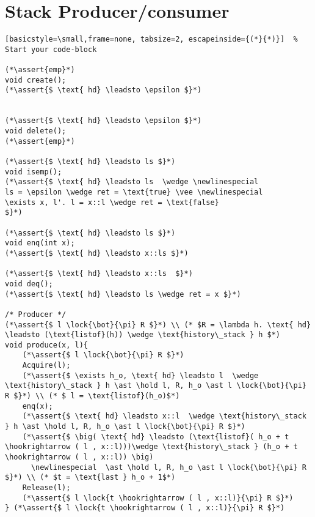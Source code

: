 \documentclass[8pt]{article}
\newcommand{\lock}[2]{ \square \hspace{-1ex} \xrightarrow[#1]{#2}}
\newcommand{\hold}{\text{Hold }}
\newcommand{\assert}[1]{\textcolor{blue}{ \{ #1 \}  } }
\newcommand{\newlinespecial}{\newline \hphantom{100pt}}
\begin{document}




\newpage
\section{Stack Producer/consumer}
\begin{lstlisting}[basicstyle=\small,frame=none, tabsize=2, escapeinside={(*}{*)}]  % Start your code-block

(*\assert{emp}*)
void create();
(*\assert{$ \text{ hd} \leadsto \epsilon $}*)


(*\assert{$ \text{ hd} \leadsto \epsilon $}*)
void delete();
(*\assert{emp}*)

(*\assert{$ \text{ hd} \leadsto ls $}*)
void isemp();
(*\assert{$ \text{ hd} \leadsto ls  \wedge \newlinespecial
ls = \epsilon \wedge ret = \text{true} \vee \newlinespecial
\exists x, l'. l = x::l \wedge ret = \text{false}
$}*)

(*\assert{$ \text{ hd} \leadsto ls $}*)
void enq(int x);
(*\assert{$ \text{ hd} \leadsto x::ls $}*)

(*\assert{$ \text{ hd} \leadsto x::ls  $}*)
void deq();
(*\assert{$ \text{ hd} \leadsto ls \wedge ret = x $}*)

/* Producer */
(*\assert{$ l \lock{\bot}{\pi} R $}*) \\ (* $R = \lambda h. \text{ hd} \leadsto (\text{listof}(h)) \wedge \text{history\_stack } h $*)
void produce(x, l){
	(*\assert{$ l \lock{\bot}{\pi} R $}*)
	Acquire(l);
	(*\assert{$ \exists h_o, \text{ hd} \leadsto l  \wedge \text{history\_stack } h \ast \hold l, R, h_o \ast l \lock{\bot}{\pi} R $}*) \\ (* $ l = \text{listof}(h_o)$*)
	enq(x);
	(*\assert{$ \text{ hd} \leadsto x::l  \wedge \text{history\_stack } h \ast \hold l, R, h_o \ast l \lock{\bot}{\pi} R $}*)
	(*\assert{$ \big( \text{ hd} \leadsto (\text{listof}( h_o + t \hookrightarrow ( l , x::l)))\wedge \text{history\_stack } (h_o + t \hookrightarrow ( l , x::l)) \big)
	  \newlinespecial  \ast \hold l, R, h_o \ast l \lock{\bot}{\pi} R $}*) \\ (* $t = \text{last } h_o + 1$*)
	Release(l);
	(*\assert{$ l \lock{t \hookrightarrow ( l , x::l)}{\pi} R $}*)
} (*\assert{$ l \lock{t \hookrightarrow ( l , x::l)}{\pi} R $}*)
	

\end{lstlisting}
\end{document}

